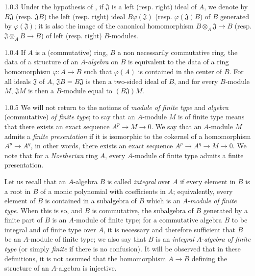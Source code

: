 \documentclass{book}
\begin{document}
\begin{env}{1.0.3}
\label{env-0.1.0.3}
Under the hypothesis of , if $\mathfrak{J}$ is a left (resp. right) ideal of $A$, we
denote by $B\mathfrak{J}$ (resp. $\mathfrak{J}B$) the left (resp. right) ideal $B\varphi(\mathfrak{J})$
(resp. $\varphi(\mathfrak{J})B$) of $B$ generated by $\varphi(\mathfrak{J})$; it is also the image
of the canonical homomorphism $B\otimes_A\mathfrak{J}\to B$ (resp. $\mathfrak{J}\otimes_A B\to B$)
of left (resp. right) $B$-modules.
\end{env}

\begin{env}{1.0.4}
\label{env-0.1.0.4}
If $A$ is a (commutative) ring, $B$ a non necessarily commutative ring, the data of
a structure of an $A$-\emph{algebra} on $B$ is equivalent to the data of a ring
homomorphism $\varphi\colon A\to B$ such that $\varphi(A)$ is contained in the center of $B$.
For all ideals $\mathfrak{J}$ of $A$, $\mathfrak{J}B=B\mathfrak{J}$ is then a two-sided ideal of $B$, and
for every $B$-module $M$, $\mathfrak{J}M$ is then a $B$-module equal to $(B\mathfrak{J})M$.
\end{env}

\begin{env}{1.0.5}
\label{env-0.1.0.5}
We will not return to the notions of \emph{module of finite type} and
\emph{algebra} (commutative) \emph{of finite type}; to say that an $A$-module $M$
is of finite type means that there exists an exact sequence $A^p\to M\to 0$. We say that
an $A$-module $M$ admits a \emph{finite presentation} if it is isomorphic to the cokernel
of a homomorphism $A^p\to A^q$, in other words, there exists an exact sequence
$A^p\to A^q\to M\to 0$. We note that for a \emph{Noetherian} ring $A$, every $A$-module
of finite type admits a finite presentation.

Let us recall that an $A$-algebra $B$ is called \emph{integral} over $A$ if every element
in $B$ is a root in $B$ of a monic polynomial with coefficients in $A$; equivalently, every
element of $B$ is contained in a subalgebra of $B$ which is an $A$-\emph{module of finite type}.
When this is so, and $B$ is commutative, the subalgebra of $B$ generated by a finite part of
$B$ is an $A$-module of finite type; for a commutative algebra $B$ to be integral and of finite
type over $A$, it is necessary and therefore sufficient that $B$ be an $A$-module of finite
type; we also say that $B$ is an \emph{integral} $A$-\emph{algebra of finite type} (or
simply \emph{finite} if there is no confusion). It will be observed that in these definitions,
it is not assumed that the homomorphism $A\to B$ defining the structure of an $A$-algebra
is injective.
\end{env}
\end{document}
